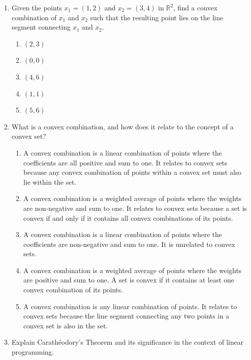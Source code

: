 \documentclass{article}%
\begin{document}
\begin{enumerate}
\begin{enumerate}
\item A convex combination is a linear combination of points where the coefficients are all positive and sum to one. It's significant because it defines the interior of a convex set.%
\end{enumerate}%
\vspace{1em}%
\item Given the points $x_1 = (1, 2)$ and $x_2 = (3, 4)$ in $\mathbb{R}^2$, find a convex combination of $x_1$ and $x_2$ such that the resulting point lies on the line segment connecting $x_1$ and $x_2$.%
\begin{enumerate}%
\item $(2, 3)$%
\item $(0, 0)$%
\item $(4, 6)$%
\item $(1, 1)$%
\item $(5, 6)$%
\end{enumerate}%
\vspace{1em}%
\item What is a convex combination, and how does it relate to the concept of a convex set?%
\begin{enumerate}%
\item A convex combination is a linear combination of points where the coefficients are all positive and sum to one.  It relates to convex sets because any convex combination of points within a convex set must also lie within the set.%
\item A convex combination is a weighted average of points where the weights are non-negative and sum to one. It relates to convex sets because a set is convex if and only if it contains all convex combinations of its points.%
\item A convex combination is a linear combination of points where the coefficients are non-negative and sum to one. It is unrelated to convex sets.%
\item A convex combination is a weighted average of points where the weights are positive and sum to one. A set is convex if it contains at least one convex combination of its points.%
\item A convex combination is any linear combination of points.  It relates to convex sets because the line segment connecting any two points in a convex set is also in the set.%
\end{enumerate}%
\vspace{1em}%
\item Explain Carathéodory's Theorem and its significance in the context of linear programming.%

\end{enumerate}
\end{document}
